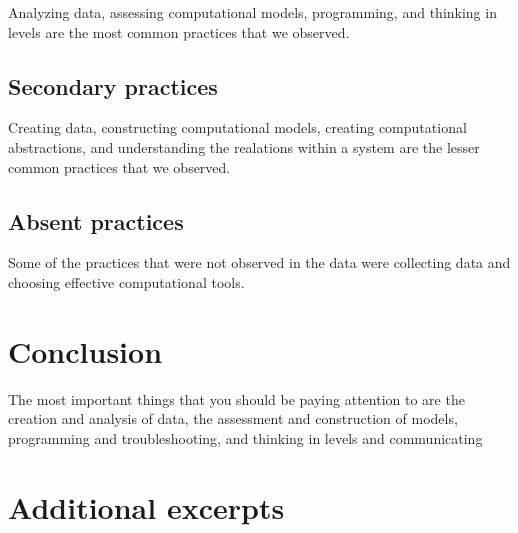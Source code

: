 \documentclass{msuphddissertation}
\begin{document}
\begin{doublespace}
Analyzing data, assessing computational models, programming, and thinking in levels are the most common practices that we observed.

\section{Secondary practices}

Creating data, constructing computational models, creating computational abstractions, and understanding the realations within a system are the lesser common practices that we observed.

\section{Absent practices}

Some of the practices that were not observed in the data were collecting data and choosing effective computational tools.

%
%

\chapter{Conclusion}\label{CH7:Conclusion}

The most important things that you should be paying attention to are the creation and analysis of data, the assessment and construction of models, programming and troubleshooting, and thinking in levels and communicating

%
%

\appendices

\chapter{Additional excerpts}

%
%

\end{doublespace}



\end{document}
